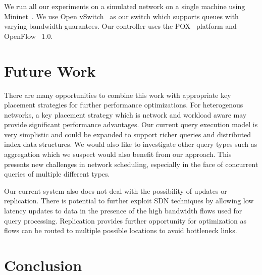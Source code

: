 \documentclass{sig-alternate-2013}
\begin{document}
We run all our experiments on a simulated network on a single machine using Mininet~\cite{Lantz2010}.
We use Open vSwitch~\cite{Pfaff2009} as our switch which supports queues with varying bandwidth guarantees.
Our controller uses the POX~\cite{Gude2008} platform and OpenFlow~\cite{McKeown2008} 1.0.

\section{Future Work}

There are many opportunities to combine this work with appropriate key placement strategies for further performance optimizations.
For heterogenous networks, a key placement strategy which is network and workload aware may provide significant performance advantages.
Our current query execution model is very simplistic and could be expanded to support richer queries and distributed index data structures.
We would also like to investigate other query types such as aggregation which we suspect would also benefit from our approach.
This presents new challenges in network scheduling, especially in the face of concurrent queries of multiple different types.

Our current system also does not deal with the possibility of updates or replication.
There is potential to further exploit SDN techniques by allowing low latency updates to data in the presence of the high bandwidth flows used for query processing.
Replication provides further opportunity for optimization as flows can be routed to multiple possible locations to avoid bottleneck links.

\section{Conclusion}

\let\theOLDbibliography\thebibliography\renewcommand{\thebibliography}[1]{\theOLDbibliography{#1}%
\item[]\vspace*{0.5mm}}


{\scriptsize

}
\end{document}
